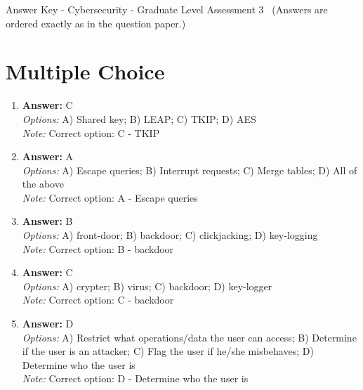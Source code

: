 \documentclass[12pt]{article}
\begin{document}
\begin{center}
Answer Key - Cybersecurity - Graduate Level Assessment 3 \
\small (Answers are ordered exactly as in the question paper.)
\end{center}

\section*{Multiple Choice}
\begin{enumerate}[label=\arabic*.]
\item \textbf{Answer:} C
\\ \textit{Options:} A) Shared key; B) LEAP; C) TKIP; D) AES
\\ \textit{Note:} Correct option: C - TKIP
\item \textbf{Answer:} A
\\ \textit{Options:} A) Escape queries; B) Interrupt requests; C) Merge tables; D) All of the above
\\ \textit{Note:} Correct option: A - Escape queries
\item \textbf{Answer:} B
\\ \textit{Options:} A) front-door; B) backdoor; C) clickjacking; D) key-logging
\\ \textit{Note:} Correct option: B - backdoor
\item \textbf{Answer:} C
\\ \textit{Options:} A) crypter; B) virus; C) backdoor; D) key-logger
\\ \textit{Note:} Correct option: C - backdoor
\item \textbf{Answer:} D
\\ \textit{Options:} A) Restrict what operations/data the user can access; B) Determine if the user is an attacker; C) Flag the user if he/she misbehaves; D) Determine who the user is
\\ \textit{Note:} Correct option: D - Determine who the user is
\end{enumerate}
\end{document}

